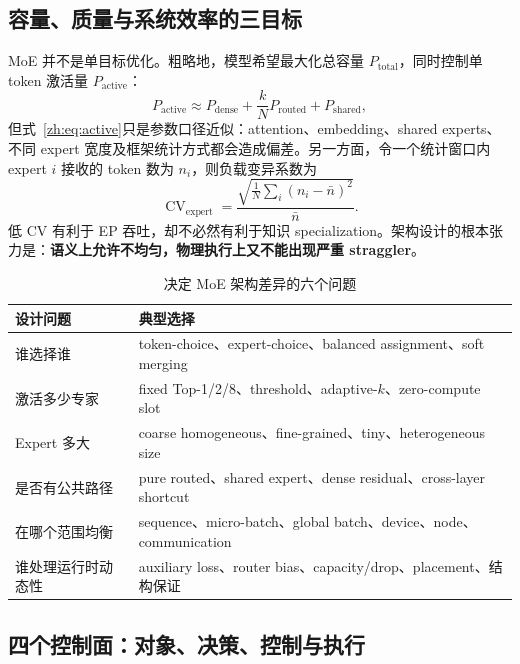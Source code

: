 \documentclass[10pt,a4paper,fontset=none]{ctexart}
\newcommand{\term}[1]{\textbf{#1}}
\begin{document}
\subsection{容量、质量与系统效率的三目标}

MoE 并不是单目标优化。粗略地，模型希望最大化总容量 $P_{\mathrm{total}}$，同时控制单 token 激活量 $P_{\mathrm{active}}$：
\begin{equation}
  P_{\mathrm{active}} \approx P_{\mathrm{dense}}
  +\frac{k}{N}P_{\mathrm{routed}}+P_{\mathrm{shared}},
  \label{zh:eq:active}
\end{equation}
但式~\eqref{zh:eq:active}只是参数口径近似：attention、embedding、shared experts、不同 expert 宽度及框架统计方式都会造成偏差。另一方面，令一个统计窗口内 expert $i$ 接收的 token 数为 $n_i$，则负载变异系数为
\begin{equation}
  \operatorname{CV}_{\mathrm{expert}}
  =\frac{\sqrt{\frac{1}{N}\sum_i(n_i-\bar n)^2}}{\bar n}.
  \label{zh:eq:cv}
\end{equation}
低 CV 有利于 EP 吞吐，却不必然有利于知识 specialization。架构设计的根本张力是：\term{语义上允许不均匀，物理执行上又不能出现严重 straggler}。

\begin{table}[htbp]
\centering
\caption{决定 MoE 架构差异的六个问题}
\label{zh:tab:sixquestions}
\small
\begin{tabularx}{\textwidth}{p{}Y}
\toprule
设计问题 & 典型选择 \\
\midrule
谁选择谁 & token-choice、expert-choice、balanced assignment、soft merging \\
激活多少专家 & fixed Top-1/2/8、threshold、adaptive-$k$、zero-compute slot \\
Expert 多大 & coarse homogeneous、fine-grained、tiny、heterogeneous size \\
是否有公共路径 & pure routed、shared expert、dense residual、cross-layer shortcut \\
在哪个范围均衡 & sequence、micro-batch、global batch、device、node、communication \\
谁处理运行时动态性 & auxiliary loss、router bias、capacity/drop、placement、结构保证 \\
\bottomrule
\end{tabularx}
\end{table}

\subsection{四个控制面：对象、决策、控制与执行}
\end{document}
